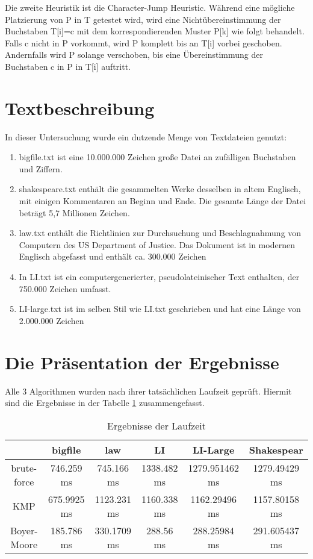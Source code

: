 \documentclass[14pt]{article}
\begin{document}
Die zweite Heuristik ist die Character-Jump Heuristic. Während eine mögliche Platzierung von P in T getestet wird, wird eine Nichtübereinstimmung der Buchstaben T[i]=c  mit dem korrespondierenden Muster P[k] wie folgt behandelt. Falls c nicht in P vorkommt, wird P komplett bis an T[i] vorbei geschoben. Andernfalls wird P solange verschoben, bis eine Übereinstimmung der Buchstaben c in P in T[i] auftritt.\\




\section{Textbeschreibung}
In dieser Untersuchung wurde ein dutzende Menge von Textdateien genutzt:\\

\begin{enumerate}
\item bigfile.txt ist eine 10.000.000 Zeichen große Datei an zufälligen Buchstaben und Ziffern.

\item shakespeare.txt enthält die gesammelten Werke desselben in altem Englisch, mit einigen Kommentaren an
 Beginn und Ende. Die gesamte Länge der Datei beträgt 5,7 Millionen Zeichen.
\item law.txt enthält die Richtlinien zur Durchsuchung und Beschlagnahmung von Computern des US Department of Justice. Das Dokument ist in modernen Englisch abgefasst und enthält ca. 300.000 Zeichen
\item In LI.txt ist ein computergenerierter,
 pseudolateinischer Text enthalten, der 750.000 Zeichen umfasst.
\item LI-large.txt ist im selben Stil wie LI.txt geschrieben und hat eine Länge von 2.000.000 Zeichen
\end{enumerate}

\section{Die Präsentation der Ergebnisse}
Alle 3 Algorithmen wurden nach ihrer tatsächlichen Laufzeit geprüft. Hiermit sind die Ergebnisse in der Tabelle  \ref{Ergebnisse} zusammengefasst. 


\begin{table}[h]
\begin{tabular}{ |c|c|c|c|c|c| }
\hline
  & bigfile & law & LI & LI-Large & Shakespear \\
\hline 
 brute-force & 746.259 ms & 745.166 ms & 1338.482 ms& 1279.951462 ms & 1279.49429 ms\\ 
\hline
 KMP & 675.9925 ms & 1123.231 ms & 1160.338 ms & 1162.29496 ms & 1157.80158 ms\\ 
\hline
 Boyer-Moore & 185.786 ms & 330.1709 ms & 288.56 ms & 288.25984 ms & 291.605437 ms\\ 
\hline
\end{tabular}
\label{Ergebnisse}
\caption{ Ergebnisse der Laufzeit}
\end{table}
\end{document}
